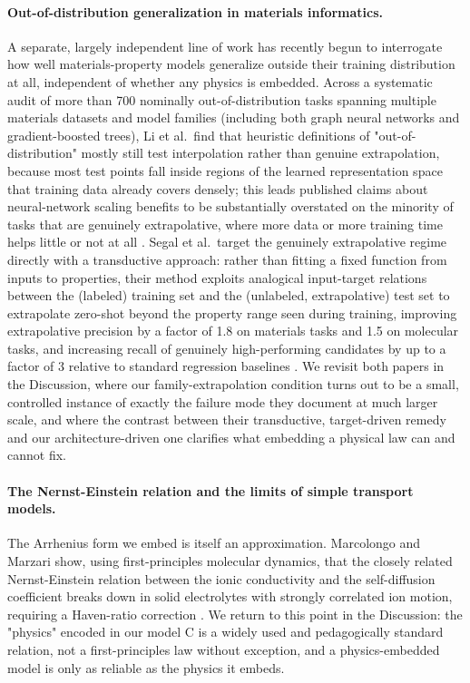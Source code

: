 \documentclass[11pt]{article}
\begin{document}
\paragraph{Out-of-distribution generalization in materials informatics.} A separate, largely independent line of work has recently begun to interrogate how well materials-property models generalize outside their training distribution at all, independent of whether any physics is embedded. Across a systematic audit of more than 700 nominally out-of-distribution tasks spanning multiple materials datasets and model families (including both graph neural networks and gradient-boosted trees), Li et al.\ find that heuristic definitions of "out-of-distribution" mostly still test interpolation rather than genuine extrapolation, because most test points fall inside regions of the learned representation space that training data already covers densely; this leads published claims about neural-network scaling benefits to be substantially overstated on the minority of tasks that are genuinely extrapolative, where more data or more training time helps little or not at all \citep{li2025probingood}. Segal et al.\ target the genuinely extrapolative regime directly with a transductive approach: rather than fitting a fixed function from inputs to properties, their method exploits analogical input-target relations between the (labeled) training set and the (unlabeled, extrapolative) test set to extrapolate zero-shot beyond the property range seen during training, improving extrapolative precision by a factor of 1.8 on materials tasks and 1.5 on molecular tasks, and increasing recall of genuinely high-performing candidates by up to a factor of 3 relative to standard regression baselines \citep{segal2025knownunknowns}. We revisit both papers in the Discussion, where our family-extrapolation condition turns out to be a small, controlled instance of exactly the failure mode they document at much larger scale, and where the contrast between their transductive, target-driven remedy and our architecture-driven one clarifies what embedding a physical law can and cannot fix.

\paragraph{The Nernst-Einstein relation and the limits of simple transport models.} The Arrhenius form we embed is itself an approximation. Marcolongo and Marzari show, using first-principles molecular dynamics, that the closely related Nernst-Einstein relation between the ionic conductivity and the self-diffusion coefficient breaks down in solid electrolytes with strongly correlated ion motion, requiring a Haven-ratio correction \citep{marcolongo2017nernsteinstein}. We return to this point in the Discussion: the "physics" encoded in our model C is a widely used and pedagogically standard relation, not a first-principles law without exception, and a physics-embedded model is only as reliable as the physics it embeds.
\end{document}
